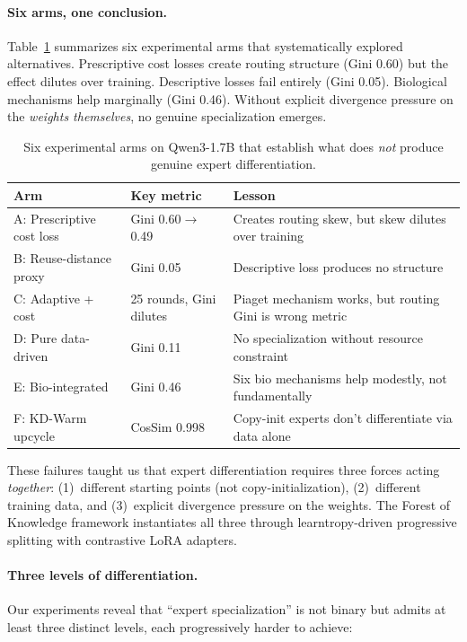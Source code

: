 \documentclass{article}
\newcommand{\tok}{Forest of Knowledge}
\begin{document}
\paragraph{Six arms, one conclusion.}
Table~\ref{tab:lessons} summarizes six experimental arms that systematically
explored alternatives. Prescriptive cost losses create routing structure (Gini
0.60) but the effect dilutes over training. Descriptive losses fail entirely
(Gini 0.05). Biological mechanisms help marginally (Gini 0.46). Without
explicit divergence pressure on the \emph{weights themselves}, no genuine
specialization emerges.

\begin{table}[t]
\centering
\caption{Six experimental arms on Qwen3-1.7B that establish what does \emph{not}
produce genuine expert differentiation.}
\label{tab:lessons}
\begin{tabular}{@{}llp{6.5cm}@{}}
\toprule
Arm & Key metric & Lesson \\
\midrule
A: Prescriptive cost loss  & Gini 0.60$\to$0.49 & Creates routing skew, but skew dilutes over training \\
B: Reuse-distance proxy     & Gini 0.05           & Descriptive loss produces no structure \\
C: Adaptive + cost          & 25 rounds, Gini dilutes & Piaget mechanism works, but routing Gini is wrong metric \\
D: Pure data-driven         & Gini 0.11           & No specialization without resource constraint \\
E: Bio-integrated           & Gini 0.46           & Six bio mechanisms help modestly, not fundamentally \\
F: KD-Warm upcycle          & CosSim 0.998        & Copy-init experts don't differentiate via data alone \\
\bottomrule
\end{tabular}
\end{table}

These failures taught us that expert differentiation requires three forces acting
\emph{together}: (1)~different starting points (not copy-initialization),
(2)~different training data, and (3)~explicit divergence pressure on the weights.
The \tok{} framework instantiates all three through learntropy-driven progressive
splitting with contrastive LoRA adapters.

\paragraph{Three levels of differentiation.}
Our experiments reveal that ``expert specialization'' is not binary but admits
at least three distinct levels, each progressively harder to achieve:
\end{document}
